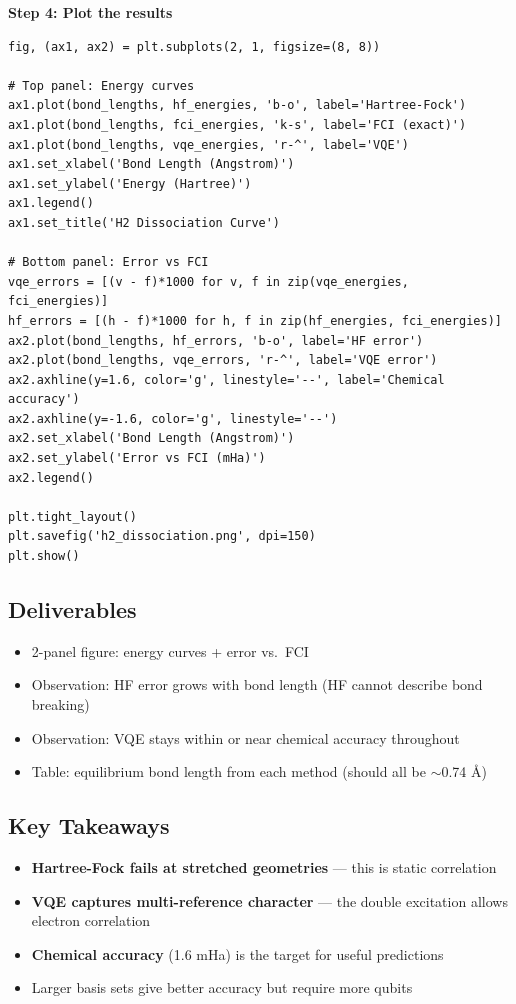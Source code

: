 \documentclass[11pt,a4paper]{article}
\begin{document}
\textbf{Step 4: Plot the results}
\begin{lstlisting}
fig, (ax1, ax2) = plt.subplots(2, 1, figsize=(8, 8))

# Top panel: Energy curves
ax1.plot(bond_lengths, hf_energies, 'b-o', label='Hartree-Fock')
ax1.plot(bond_lengths, fci_energies, 'k-s', label='FCI (exact)')
ax1.plot(bond_lengths, vqe_energies, 'r-^', label='VQE')
ax1.set_xlabel('Bond Length (Angstrom)')
ax1.set_ylabel('Energy (Hartree)')
ax1.legend()
ax1.set_title('H2 Dissociation Curve')

# Bottom panel: Error vs FCI
vqe_errors = [(v - f)*1000 for v, f in zip(vqe_energies, fci_energies)]
hf_errors = [(h - f)*1000 for h, f in zip(hf_energies, fci_energies)]
ax2.plot(bond_lengths, hf_errors, 'b-o', label='HF error')
ax2.plot(bond_lengths, vqe_errors, 'r-^', label='VQE error')
ax2.axhline(y=1.6, color='g', linestyle='--', label='Chemical accuracy')
ax2.axhline(y=-1.6, color='g', linestyle='--')
ax2.set_xlabel('Bond Length (Angstrom)')
ax2.set_ylabel('Error vs FCI (mHa)')
ax2.legend()

plt.tight_layout()
plt.savefig('h2_dissociation.png', dpi=150)
plt.show()
\end{lstlisting}

\subsection*{Deliverables}
\begin{itemize}
    \item[\checkmark] 2-panel figure: energy curves + error vs.\ FCI
    \item[\checkmark] Observation: HF error grows with bond length (HF cannot describe bond breaking)
    \item[\checkmark] Observation: VQE stays within or near chemical accuracy throughout
    \item[\checkmark] Table: equilibrium bond length from each method (should all be $\sim$0.74 \AA)
\end{itemize}

\subsection*{Key Takeaways}
\begin{itemize}
    \item \textbf{Hartree-Fock fails at stretched geometries} --- this is static correlation
    \item \textbf{VQE captures multi-reference character} --- the double excitation allows electron correlation
    \item \textbf{Chemical accuracy} (1.6 mHa) is the target for useful predictions
    \item Larger basis sets give better accuracy but require more qubits
\end{itemize}
\end{document}

